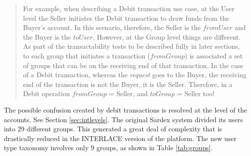 \begin{quote}
\vspace{-0.3cm}
\small
For example, when describing a Debit transaction use case, at the User level the Seller initiates the Debit transaction to draw funds from the Buyer's account. In this scenario, therefore, the Seller is the $fromUser$ and the Buyer is the $toUser$. However, at the Group level things are different. As part of the transactability tests to be described fully in later sections, to each group that initiates a transaction ($fromGroup$) is associated a set of groups that can be on the receiving end of that transaction. In the case of a Debit transaction, whereas the \emph{request} goes to the Buyer, the receiving end of the transaction is not the Buyer, it is the Seller. Therefore, in a Debit operation $fromGroup$ = Seller, and $toGroup$ = Seller too!
\vspace{-0.3cm}
\end{quote}

The possible confusion created by debit transactions is resolved at the level of the accounts. See Section \ref{sec:intlevels}. The original Sardex system divided its users into 29 different groups. This generated a great deal of complexity that is drastically reduced in the INTERLACE version of the platform. The new user type taxonomy involves only 9 groups, as shown in Table \ref{tab:groups}.

